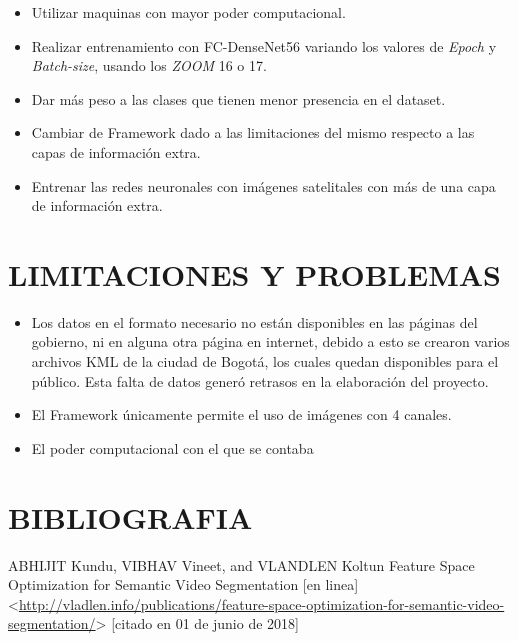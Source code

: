 	\begin{itemize}
	
	\item Utilizar maquinas con mayor poder computacional. 

    \item Realizar entrenamiento con FC-DenseNet56 variando los valores de \textit{Epoch} y \textit{Batch-size}, usando los \textit{ZOOM} 16 o 17. 

    \item Dar más peso a las clases que tienen menor presencia en el dataset. 

    \item Cambiar de Framework dado a las limitaciones del mismo respecto a las capas de información extra. 

    \item Entrenar las redes neuronales con imágenes satelitales con más de una capa de información extra. 
	
	
	\end{itemize}
  


    
\newpage\chapter{LIMITACIONES Y PROBLEMAS} 

	\begin{itemize}
		\item Los datos en el formato necesario no están disponibles en las páginas del gobierno, ni en alguna otra página en internet, debido a esto se crearon varios archivos KML de la ciudad de Bogotá, los cuales quedan disponibles para el público. Esta falta de datos generó retrasos en la elaboración del proyecto. 

        \item{El Framework únicamente permite el uso de imágenes con 4 canales.} 

        \item{El poder computacional con el que se contaba} 	
	
	\end{itemize}
        
    
    


    
\newpage\chapter*{BIBLIOGRAFIA}
ABHIJIT Kundu, VIBHAV Vineet, and VLANDLEN Koltun Feature Space Optimization for Semantic Video Segmentation [en linea] <\url{http://vladlen.info/publications/feature-space-optimization-for-semantic-video-segmentation/}> [citado en 01 de junio de 2018]

